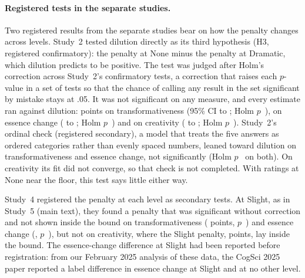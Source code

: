\paragraph*{Registered tests in the separate studies.}
Two registered results from the separate studies bear on how the penalty changes across levels. Study~2 tested dilution directly as its third hypothesis (H3, registered confirmatory): the penalty at None minus the penalty at Dramatic, which dilution predicts to be positive. The test was judged after Holm's correction across Study~2's confirmatory tests, a correction\cite{holm1979simple} that raises each $p$-value in a set of tests so that the chance of calling any result in the set significant by mistake stays at .05. It was not significant on any measure, and every estimate ran against dilution: \STwoTransPenaltyChangeEst{} points on transformativeness (95\% CI \STwoTransPenaltyChangeLo{} to \STwoTransPenaltyChangeHi; Holm $p$~\STwoTransPenaltyChangePHolm), \STwoEssPenaltyChangeEst{} on essence change (\STwoEssPenaltyChangeLo{} to \STwoEssPenaltyChangeHi; Holm $p$~\STwoEssPenaltyChangePHolm) and \STwoCreatPenaltyChangeEst{} on creativity (\STwoCreatPenaltyChangeLo{} to \STwoCreatPenaltyChangeHi; Holm $p$~\STwoCreatPenaltyChangePHolm). Study~2's ordinal check (registered secondary), a model that treats the five answers as ordered categories rather than evenly spaced numbers, leaned toward dilution on transformativeness and essence change, not significantly (Holm $p$~\STwoTransPenaltyChangeOrdPHolm{} on both). On creativity its fit did not converge, so that check is not completed. With ratings at None near the floor, this test says little either way.

Study~4 registered the penalty at each level as secondary tests. At Slight, as in Study~5 (main text), they found a penalty that was significant without correction and not shown inside the bound on transformativeness (\SFourTransPenaltySlightEst{} points, $p$~\SFourTransPenaltySlightP) and essence change (\SFourEssPenaltySlightEst, $p$~\SFourEssPenaltySlightP), but not on creativity, where the Slight penalty, \SFourCreatPenaltySlightEst{} points, lay inside the bound. The essence-change difference at Slight had been reported before registration: from our February 2025 analysis of these data, the CogSci 2025 paper reported a label difference in essence change at Slight and at no other level.\cite{kamper2025originalsin}

